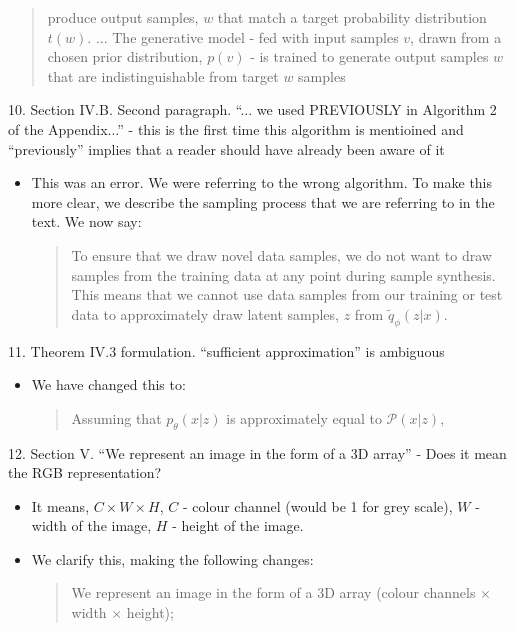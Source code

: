 \documentclass{article}
\begin{document}
    \begin{quote}
        produce output samples, $w$ that match a target probability distribution $t(w)$. \newline ... \newline
        The generative model - fed with input samples $v$, drawn from a chosen prior distribution, $p(v)$ - is trained to generate output samples $w$ that are indistinguishable from target $w$ samples  
    \end{quote}


{\color{blue}
10. Section IV.B. Second paragraph. ``... we used PREVIOUSLY in Algorithm 2 of the Appendix...'' - this is the first time this algorithm is mentioined and ``previously'' implies that a reader should have already been aware of it}
\begin{itemize}
    \item This was an error. We were referring to the wrong algorithm. To make this more clear, we describe the sampling process that we are referring to in the text. We now say:
    \begin{quote}
        To ensure that we draw novel data samples, we do not want to draw samples from the training data at any point during sample synthesis. This means that we cannot use data samples from our training or test data to approximately draw latent samples, $z$ from $\tilde{q}_\phi(z|x)$.
    \end{quote} 
\end{itemize}

{\color{blue}
11. Theorem IV.3 formulation. ``sufficient approximation'' is ambiguous}
\begin{itemize}
    \item We have changed this to:
    \begin{quote}
        Assuming that $p_\theta(x|z)$ is approximately equal to $\mathcal{P}(x|z)$,
    \end{quote}
\end{itemize}

{\color{blue}
12. Section V. ``We represent an image in the form of a 3D array'' - Does it mean the RGB representation?}
\begin{itemize}
    \item It means, $C \times W \times H$, $C$ - colour channel (would be 1 for grey scale), $W$ - width of the image, $H$ - height of the image.
    \item We clarify this, making the following changes:
    \begin{quote}
        We represent an image in the form of a $3$D array (colour channels $\times$ width $\times$ height);
    \end{quote}
\end{itemize}
\end{document}

